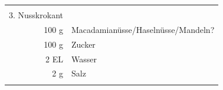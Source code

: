\documentclass[a4paper, 12pt]{scrbook} 								%
\numberwithin{equation}{section} 									%
\begin{document}
\begin{tabularx}{\textwidth}{r|L}
\begin{tabular}[t]{llll}
											\\
										3. Nusskrokant \\
											100 g & Macadamianüsse/Haselnüsse/Mandeln? \\
											100 g & Zucker \\
											2 EL & Wasser \\
											2 g & Salz 
										\end{tabular}	\\
									&	\\
			\end{tabularx}
			\newpage
\end{document}
